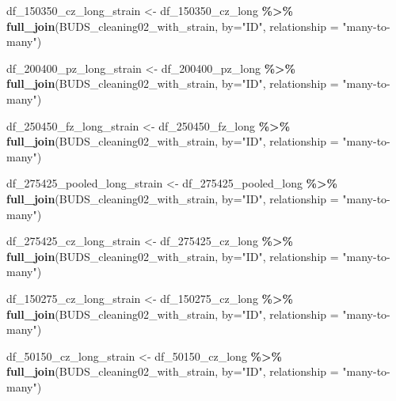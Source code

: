 \documentclass[
]{article}
\newenvironment{Shaded}{\begin{snugshade}}{\end{snugshade}}
\newcommand{\AttributeTok}[1]{\textcolor[rgb]{0.13,0.29,0.53}{#1}}
\newcommand{\FunctionTok}[1]{\textcolor[rgb]{0.13,0.29,0.53}{\textbf{#1}}}
\newcommand{\NormalTok}[1]{#1}
\newcommand{\OtherTok}[1]{\textcolor[rgb]{0.56,0.35,0.01}{#1}}
\newcommand{\SpecialCharTok}[1]{\textcolor[rgb]{0.81,0.36,0.00}{\textbf{#1}}}
\newcommand{\StringTok}[1]{\textcolor[rgb]{0.31,0.60,0.02}{#1}}
\begin{document}
\begin{Shaded}
\begin{Highlighting}[]
\NormalTok{df\_150350\_cz\_long\_strain }\OtherTok{\textless{}{-}}\NormalTok{ df\_150350\_cz\_long }\SpecialCharTok{\%\textgreater{}\%}
  \FunctionTok{full\_join}\NormalTok{(BUDS\_cleaning02\_with\_strain, }\AttributeTok{by=}\StringTok{"ID"}\NormalTok{, }\AttributeTok{relationship =} \StringTok{"many{-}to{-}many"}\NormalTok{)}

\NormalTok{df\_200400\_pz\_long\_strain }\OtherTok{\textless{}{-}}\NormalTok{ df\_200400\_pz\_long }\SpecialCharTok{\%\textgreater{}\%}
  \FunctionTok{full\_join}\NormalTok{(BUDS\_cleaning02\_with\_strain, }\AttributeTok{by=}\StringTok{"ID"}\NormalTok{, }\AttributeTok{relationship =} \StringTok{"many{-}to{-}many"}\NormalTok{)}

\NormalTok{df\_250450\_fz\_long\_strain }\OtherTok{\textless{}{-}}\NormalTok{ df\_250450\_fz\_long }\SpecialCharTok{\%\textgreater{}\%}
  \FunctionTok{full\_join}\NormalTok{(BUDS\_cleaning02\_with\_strain, }\AttributeTok{by=}\StringTok{"ID"}\NormalTok{, }\AttributeTok{relationship =} \StringTok{"many{-}to{-}many"}\NormalTok{)}

\NormalTok{df\_275425\_pooled\_long\_strain }\OtherTok{\textless{}{-}}\NormalTok{ df\_275425\_pooled\_long }\SpecialCharTok{\%\textgreater{}\%}
  \FunctionTok{full\_join}\NormalTok{(BUDS\_cleaning02\_with\_strain, }\AttributeTok{by=}\StringTok{"ID"}\NormalTok{, }\AttributeTok{relationship =} \StringTok{"many{-}to{-}many"}\NormalTok{)}

\NormalTok{df\_275425\_cz\_long\_strain }\OtherTok{\textless{}{-}}\NormalTok{ df\_275425\_cz\_long }\SpecialCharTok{\%\textgreater{}\%}
  \FunctionTok{full\_join}\NormalTok{(BUDS\_cleaning02\_with\_strain, }\AttributeTok{by=}\StringTok{"ID"}\NormalTok{, }\AttributeTok{relationship =} \StringTok{"many{-}to{-}many"}\NormalTok{)}

\NormalTok{df\_150275\_cz\_long\_strain }\OtherTok{\textless{}{-}}\NormalTok{ df\_150275\_cz\_long }\SpecialCharTok{\%\textgreater{}\%}
  \FunctionTok{full\_join}\NormalTok{(BUDS\_cleaning02\_with\_strain, }\AttributeTok{by=}\StringTok{"ID"}\NormalTok{, }\AttributeTok{relationship =} \StringTok{"many{-}to{-}many"}\NormalTok{)}

\NormalTok{df\_50150\_cz\_long\_strain }\OtherTok{\textless{}{-}}\NormalTok{ df\_50150\_cz\_long }\SpecialCharTok{\%\textgreater{}\%}
  \FunctionTok{full\_join}\NormalTok{(BUDS\_cleaning02\_with\_strain, }\AttributeTok{by=}\StringTok{"ID"}\NormalTok{, }\AttributeTok{relationship =} \StringTok{"many{-}to{-}many"}\NormalTok{)}
\end{Highlighting}
\end{Shaded}
\end{document}
